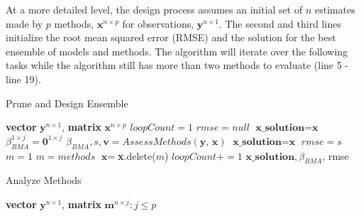\documentclass[journal=jpcbfk, manuscript=article]{achemso}
\newcommand{\+}[1]{\ensuremath{\mathbf{#1}}}
\begin{document}
At a more detailed level, the design process assumes an initial set of $n$ estimates made by $p$ methods, $\textbf{x}^{n \times p}$ for observations, $\textbf{y}^{n \times 1}$.
The second and third lines initialize the root mean squared error (RMSE) and the solution for the best ensemble of models and methods.
The algorithm will iterate over the following tasks while the algorithm still has more than two methods to evaluate (line 5 - line 19).

\begin{table}[t] 
	\begin{minipage}[t]{0.45\linewidth}\centering 
		\begin{algorithm}[H] 
			\footnotesize 
			\caption{\newline Prune and Design Ensemble} \label{Method:Alg1} 
			\begin{algorithmic}[1] 
				{\scriptsize 
				\REQUIRE \textbf{vector} $\textbf{y}^{n \times 1}$, \textbf{matrix} $\textbf{x}^{n \times p}$\; 
				\vspace{2.5mm} 
				\STATE $loopCount = 1$\; 
				\STATE $rmse = null$\; 
				\STATE $\textbf{x\_solution} = \textbf{x}$\; 
				\STATE $\beta_{BMA}^{1 \times j} = \textbf{0}^{1 \times j}$\; 
				\; 
					\STATE $\beta_{BMA}, s, \textbf{v} = Assess Methods(\textbf{y, x})$\; 
					\; 
						\STATE $\textbf{x\_solution} = \textbf{x}$\; 
						\STATE $rmse = s$\; 
					\ENDIF\; 
					\STATE $m = 1$\; 
					\; 
						\; 
							\STATE $m = methods$\;
						\ENDIF\;
					\ENDFOR\;
					\STATE $\textbf{x} = $\textbf{x}.delete($m$)
					\;
					\STATE $loopCount += 1$\;
				\ENDWHILE\;
				\RETURN $\textbf{x\_solution},\beta_{BMA}$, rmse\;} 
			\end{algorithmic}
		\end{algorithm}
	\end{minipage}
	\hspace{0.5cm}
	\begin{minipage}[t]{0.45\linewidth}
		\centering
		\begin{algorithm}[H] 
			\footnotesize 
			\caption{\newline Analyze Methods} \label{Method:Alg2} 
			\begin{algorithmic}[1] 
				{\scriptsize 
				\REQUIRE  \textbf{vector} $\textbf{y}^{n \times 1}$, \textbf{matrix} $\textbf{m}^{n \times j}: j \leq p$\; 
				\vspace{2.5mm} 
}
\end{algorithmic}
\end{algorithm}
\end{minipage}
\end{table}
\end{document}
